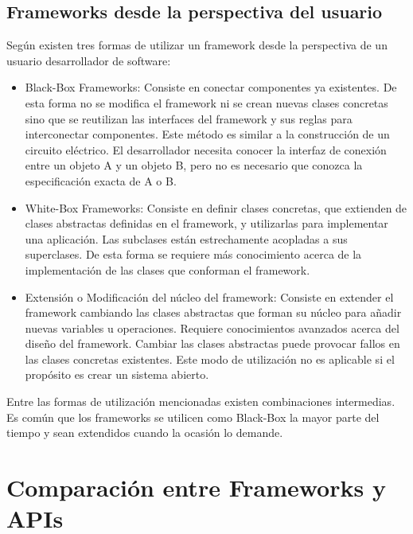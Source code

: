 \subsection{Frameworks desde la perspectiva del usuario}
\label{sec:tipos_framework}
    Según \cite{JohnsonFeb97} existen tres formas de utilizar un framework
    desde la perspectiva de un usuario desarrollador de software: 
\begin{itemize}
    \item Black-Box Frameworks: Consiste en conectar componentes ya existentes.
    De esta forma no se modifica el framework ni se crean nuevas clases
    concretas sino que se reutilizan las interfaces del framework y sus reglas
    para interconectar componentes. Este método es similar a la construcción de
    un circuito eléctrico. El desarrollador necesita conocer la interfaz de
    conexión entre un objeto A y un objeto B, pero no es necesario que conozca
    la especificación exacta de A o B.

    \item White-Box Frameworks: Consiste en definir clases concretas, que
    extienden de clases abstractas definidas en el framework, y utilizarlas
    para implementar una aplicación. Las subclases están estrechamente
    acopladas a sus superclases. De esta forma se requiere más conocimiento
    acerca de la implementación de las clases que conforman el framework.
	
	\item Extensión o Modificación del núcleo del framework:  Consiste en extender
	el framework cambiando las clases abstractas que forman su núcleo para añadir
	nuevas variables u operaciones. Requiere conocimientos avanzados acerca del
	diseño del framework. Cambiar las clases abstractas puede provocar fallos en
	las clases concretas existentes. Este modo de utilización no es aplicable si
	el propósito es crear un sistema abierto.
\end{itemize}

Entre las formas de utilización mencionadas existen combinaciones intermedias. Es común
que los frameworks se utilicen como Black-Box la mayor parte del tiempo y
sean extendidos cuando la ocasión lo demande.

\section{Comparación entre Frameworks y APIs}

